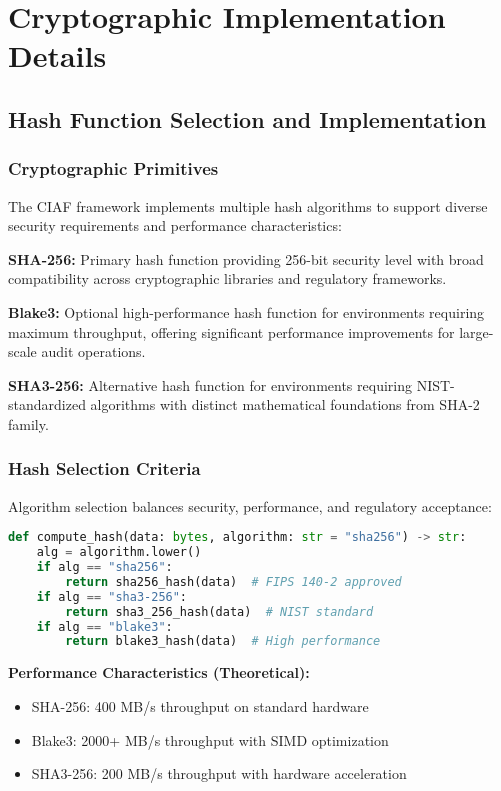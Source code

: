 \documentclass[12pt,a4paper]{article}
\begin{document}
\section{Cryptographic Implementation Details}

\subsection{Hash Function Selection and Implementation}

\subsubsection{Cryptographic Primitives}

The CIAF framework implements multiple hash algorithms to support diverse security requirements and performance characteristics:

\textbf{SHA-256:} Primary hash function providing 256-bit security level with broad compatibility across cryptographic libraries and regulatory frameworks.

\textbf{Blake3:} Optional high-performance hash function for environments requiring maximum throughput, offering significant performance improvements for large-scale audit operations.

\textbf{SHA3-256:} Alternative hash function for environments requiring NIST-standardized algorithms with distinct mathematical foundations from SHA-2 family.

\subsubsection{Hash Selection Criteria}

Algorithm selection balances security, performance, and regulatory acceptance:

\begin{lstlisting}[language=Python, caption=Hash Function Selection]
def compute_hash(data: bytes, algorithm: str = "sha256") -> str:
    alg = algorithm.lower()
    if alg == "sha256":
        return sha256_hash(data)  # FIPS 140-2 approved
    if alg == "sha3-256":
        return sha3_256_hash(data)  # NIST standard
    if alg == "blake3":
        return blake3_hash(data)  # High performance
\end{lstlisting}

\textbf{Performance Characteristics (Theoretical):}
\begin{itemize}
\item SHA-256: 400 MB/s throughput on standard hardware
\item Blake3: 2000+ MB/s throughput with SIMD optimization
\item SHA3-256: 200 MB/s throughput with hardware acceleration
\end{itemize}
\end{document}
